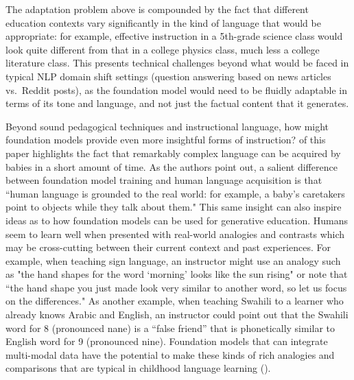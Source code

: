 
The adaptation problem above is compounded by the fact that different education contexts vary significantly in the kind of language that would be appropriate: for example, effective instruction in a 5th-grade science class would look quite different from that in a college physics class, much less a college literature class. This presents technical challenges beyond what would be faced in typical NLP domain shift settings (\eg question answering based on news articles vs.~Reddit posts), as the foundation model would need to be fluidly adaptable in terms of its tone and language, and not just the factual content that it generates.


Beyond sound pedagogical techniques and instructional language, how might foundation models provide even more insightful forms of instruction?  of this paper highlights the fact that remarkably complex language can be acquired by babies in a short amount of time. As the authors point out, a salient difference between foundation model training and human language acquisition is that ``human language is grounded to the real world: for example, a baby’s caretakers point to objects while they talk about them." This same insight can also inspire ideas as to how foundation models can be used for generative education. Humans seem to learn well when presented with real-world analogies and contrasts which may be cross-cutting between their current context and past experiences. 
For example, when teaching sign language, an instructor might use an analogy such as "the hand shapes for the word `morning' looks like the sun rising" or note that ``the hand shape you just made look very similar to another word, so let us focus on the differences."
As another example, when teaching Swahili to a learner who already knows Arabic and English, an instructor could point out that the Swahili word for 8 (pronounced nane) is a ``false friend'' that is phonetically similar to English word for 9 (pronounced nine). 
Foundation models that can integrate multi-modal data have the potential to make these kinds of rich analogies and comparisons that are typical in childhood language learning ().


